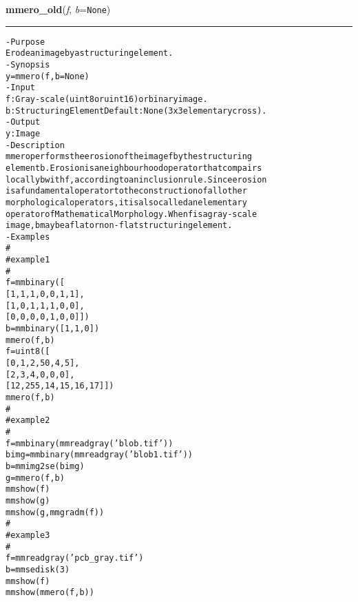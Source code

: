     \begin{boxedminipage}{\textwidth}

    \raggedright \textbf{mmero\_old}(\textit{f}, \textit{b}=\texttt{N\-o\-n\-e\-})

    \vspace{-1.5ex}

    \rule{\textwidth}{0.5\fboxrule}
\begin{alltt}
- Purpose
    Erode an image by a structuring element.
- Synopsis
    y = mmero(f, b=None)
- Input
    f: Gray-scale (uint8 or uint16) or binary image.
    b: Structuring Element Default: None (3x3 elementary cross).
- Output
    y: Image
- Description
    mmero performs the erosion of the image f by the structuring
    element b . Erosion is a neighbourhood operator that compairs
    locally b with f , according to an inclusion rule. Since erosion
    is a fundamental operator to the construction of all other
    morphological operators, it is also called an elementary
    operator of Mathematical Morphology. When f is a gray-scale
    image , b may be a flat or non-flat structuring element.
- Examples
    \#
    \#   example 1
    \#
    f=mmbinary([
       [1, 1, 1, 0, 0, 1, 1],
       [1, 0, 1, 1, 1, 0, 0],
       [0, 0, 0, 0, 1, 0, 0]])
    b=mmbinary([1, 1, 0])
    mmero(f,b)
    f=uint8([
       [ 0,   1,  2, 50,  4,  5],
       [ 2,   3,  4,  0,  0,  0],
       [12, 255, 14, 15, 16, 17]])
    mmero(f,b)
    \#
    \#   example 2
    \#
    f=mmbinary(mmreadgray('blob.tif'))
    bimg=mmbinary(mmreadgray('blob1.tif'))
    b=mmimg2se(bimg)
    g=mmero(f,b)
    mmshow(f)
    mmshow(g)
    mmshow(g,mmgradm(f))
    \#
    \#   example 3
    \#
    f=mmreadgray('pcb\_gray.tif')
    b=mmsedisk(3)
    mmshow(f)
    mmshow(mmero(f,b))\end{alltt}

    \vspace{1ex}

    \end{boxedminipage}

    \label{multireg:num_pymorph:mmflood}
    \vspace{0.5ex}

